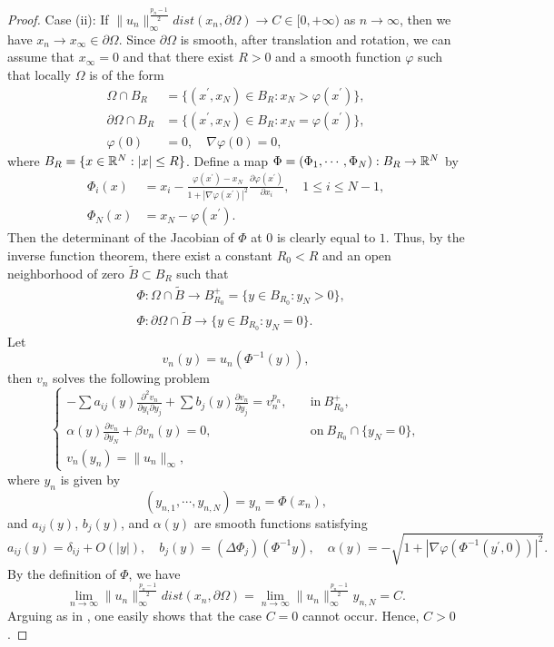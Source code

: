 \documentclass[12pt,reqno]{amsart}
\numberwithin{equation}{section}
\theoremstyle{definition}
\def\R{{\mathfrak R}}
\def\R{\Bbb R}
\begin{document}
\begin{proof}
Case (ii): If $\|u_n\|_\infty^{\frac{p_n-1}{2}}dist(x_n,\partial\Omega)\to C\in[0,+\infty)$ as $n\to\infty$, then we have $x_n\to x_\infty\in\partial\Omega$. Since $\partial\Omega$ is smooth, after translation and rotation, we can assume that $x_\infty=0$ and that there exist $R>0$ and a smooth function $\varphi$ such that locally $\Omega$ is of the form 
\begin{align*}
\Omega\cap B_R&=\{ (x^\prime,x_N)\in B_R : x_N>\varphi(x^\prime)\},\\
\partial\Omega\cap B_R&=\{(x^\prime,x_N)\in B_R : x_N=\varphi(x^\prime)\},\\
\varphi(0)&=0,\quad \nabla \varphi(0)=0,
\end{align*}
where $B_R=\{x\in\R^N : |x|\le R\}$. Define a map $\Phi=(\Phi_1,\cdots,\Phi_N): B_R\to \R^N$ by
\begin{align*}
\Phi_i(x)&=x_i-\frac{\varphi(x^\prime)-x_N}{1+|\nabla \varphi(x^\prime)|^2}\frac{\partial \varphi(x^\prime)}{\partial x_i},\quad 1\le i\le N-1,\\
\Phi_N(x)&=x_N-\varphi(x^\prime).
\end{align*}
Then the determinant of the Jacobian of $\Phi$ at $0$ is clearly equal to $1$. Thus, by the inverse function theorem, there exist a constant $R_0<R$ and an open neighborhood of zero $\tilde{B}\subset B_R$ such that 
\begin{align*}
&\Phi: \Omega\cap\tilde{B}\to B_{R_0}^+=\{y\in B_{R_0} : y_N>0\},\\
&\Phi: \partial\Omega\cap \tilde{B}\to \{y\in B_{R_0} : y_N=0\}.
\end{align*}
Let 
$$
v_n(y)=u_n(\Phi^{-1}(y)),
$$
then $v_n$ solves the following problem 
\begin{equation*}
\begin{cases}
\displaystyle -\sum a_{ij}(y)\frac{\partial^2 v_n}{\partial y_i\partial y_j}+\sum b_j(y) \frac{\partial v_n}{\partial y_j}=v_n^{p_n},\quad &\text{in}\ B_{R_0}^+,\\
\displaystyle \alpha(y)\frac{\partial v_n}{\partial y_N}+\beta v_n(y)=0, &\text{on}\ B_{R_0}\cap\{y_N=0\},\\
v_n(y_n)=\|u_n\|_\infty,
\end{cases}
\end{equation*}
where $y_n$ is given by
$$
(y_{n,1},\cdots,y_{n, N})=y_n=\Phi(x_n),
$$
and $a_{ij}(y)$, $b_j(y)$, and $\alpha(y)$ are smooth functions satisfying 
$$
a_{ij}(y)=\delta_{ij}+O(|y|),\quad b_j(y)=(\Delta\Phi_{j})(\Phi^{-1}y),\quad \alpha(y)=-\sqrt{1+|\nabla \varphi(\Phi^{-1}(y^\prime,0))|^2}.
$$
By the definition of $\Phi$, we have 
\begin{equation}\label{2.7}
\lim_{n\to\infty}\|u_n\|_\infty^{\frac{p_n-1}{2}}dist(x_n,\partial\Omega)=\lim_{n\to\infty}\|u_n\|_\infty^{\frac{p_n-1}{2}}y_{n, N}=C.
\end{equation}
Arguing as in \cite[p.~891]{GS1}, one easily shows that the case $C=0$ cannot occur. Hence, $C>0$.


\end{proof}
\end{document}
